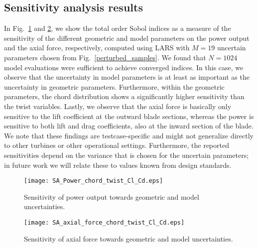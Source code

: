 
\subsection{Sensitivity analysis results}
In Fig.~\ref{fig:sensitivity_analysis_power} and \ref{fig:sensitivity_analysis_force}, we show the total order Sobol indices as a measure of the sensitivity of the different geometric and model parameters on the power output and the axial force, respectively, computed using LARS with $M=19$ uncertain parameters chosen from Fig.~\ref{perturbed_samples}. We found that $N=1024$ model evaluations were sufficient to achieve converged indices. In this case, we observe that the uncertainty in model parameters is at least as important as the uncertainty in geometric parameters. Furthermore, within the geometric parameters, the chord distribution shows a significantly higher sensitivity than the twist variables. Lastly, we observe that the axial force is basically only sensitive to the lift coefficient at the outward blade sections, whereas the power is sensitive to both lift and drag coefficients, also at the inward section of the blade. We note that these findings are testcase-specific and might not generalize directly to other turbines or other operational settings. Furthermore, the reported sensitivities depend on the variance that is chosen for the uncertain parameters; in future work we will relate these to values known from design standards.

\begin{figure}[h!]
\centering
\texttt{[image: SA\_Power\_chord\_twist\_Cl\_Cd.eps]}
\caption{Sensitivity of power output towards geometric and model uncertainties.}
\label{fig:sensitivity_analysis_power}
\end{figure}


\begin{figure}[h!]
\centering
\texttt{[image: SA\_axial\_force\_chord\_twist\_Cl\_Cd.eps]}
\caption{Sensitivity of axial force towards geometric and model uncertainties.}
\label{fig:sensitivity_analysis_force}
\end{figure}



